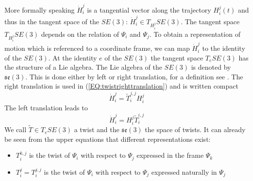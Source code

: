 \documentclass[a4paper,twoside, openright,12pt]{report}
\begin{document}
More formally speaking $ \dot{H}_i^j$ is a tangential vector along the trajectory $H_i^j(t)$ and thus in the tangent space of the $SE(3)$: $ \dot{H}_i^j \in T_{H_i^j}SE(3)$. The tangent space $T_{H_i^j}SE(3)$ depends on the relation of $\Psi_i$ and $\Psi_j$. To obtain a representation of motion which is referenced to a coordinate frame, we can map $\dot{H}_i^j$ to the identity of the $SE(3)$. At the identity $ e $ of the $SE(3)$ the tangent space $ T_e SE(3) $ has the structure of a Lie algebra. The Lie algebra of the $SE(3)$ is denoted by $\mathfrak{se}(3)$. This is done either by left or right translation, for a definition see \cite{Stramigioli_01}. The right translation is used in (\ref{EQ:twistrighttranslation}) and is written compact
\begin{equation}\label{EQ:righttranslation}
\dot{H}_i^j = \tilde{T}_i^{j,j} H_i^j
\end{equation}\label{EQ:lefttranslation}
The left translation leads to
\begin{equation}
\dot{H}_i^j = H_i^j \tilde{T}_i^{i,j} 
\end{equation}
We call $\tilde{T} \in T_e SE(3)$ a twist and the $\mathfrak{se}(3)$ the space of twists. It can already be seen from the upper equations that different representations exist:
\begin{itemize}
\item $T_i^{k,j}$ is the twist of $\Psi_i$ with respect to $\Psi_j$ expressed in the frame $\Psi_k$
\item $T_i^j = T_i^{j,j}$ is the twist of $\Psi_i$ with respect to $\Psi_j$ expressed naturally in $\Psi_j$ 
\end{itemize}
\end{document}
